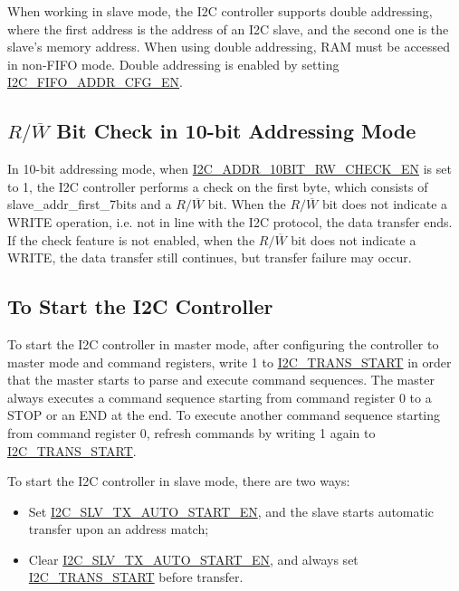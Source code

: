 \documentclass[main\_\_EN.tex]{subfiles}
\begin{document}
When working in slave mode, the I2C controller supports double addressing, where the first address is the address of an I2C slave, and the second one is the slave's memory address. When using double addressing, RAM must be accessed in non-FIFO mode. Double addressing is enabled by setting \hyperref[fielddesc:I2CFIFOADDRCFGEN]{I2C\_FIFO\_ADDR\_CFG\_EN}.

\subsection{\texorpdfstring{$R/\overline W$ Bit Check in 10-bit Addressing Mode}{R/W Bit Check in 10-bit Addressing Mode}}
In 10-bit addressing mode, when \hyperref[fielddesc:I2CADDR10BITRWCHECKEN]{I2C\_ADDR\_10BIT\_RW\_CHECK\_EN} is set to 1, the I2C controller performs a check on the first byte, which consists of slave\_addr\_first\_7bits and a $R/\overline W$ bit. When the $R/\overline W$ bit does not indicate a WRITE operation, i.e. not in line with the I2C protocol, the data transfer ends. If the check feature is not enabled, when the $R/\overline W$ bit does not indicate a WRITE, the data transfer still continues, but transfer failure may occur.

\subsection{To Start the I2C Controller}\label{subsubsec:i2c-start}
To start the I2C controller in master mode, after configuring the controller to master mode and command registers, write 1 to \hyperref[fielddesc:I2CTRANSSTART]{I2C\_TRANS\_START} in order that the master starts to parse and execute command sequences. The master always executes a command sequence starting from command register 0 to a STOP or an END at the end. To execute another command sequence starting from command register 0, refresh commands by writing 1 again to \hyperref[fielddesc:I2CTRANSSTART]{I2C\_TRANS\_START}.

To start the I2C controller in slave mode, there are two ways:

\begin{itemize}
    \item Set \hyperref[fielddesc:I2CSLVTXAUTOSTARTEN]{I2C\_SLV\_TX\_AUTO\_START\_EN}, and the slave starts automatic transfer upon an address match;
    \item Clear \hyperref[fielddesc:I2CSLVTXAUTOSTARTEN]{I2C\_SLV\_TX\_AUTO\_START\_EN}, and always set \hyperref[fielddesc:I2CTRANSSTART]{I2C\_TRANS\_START} before transfer.
\end{itemize}
\end{document}
